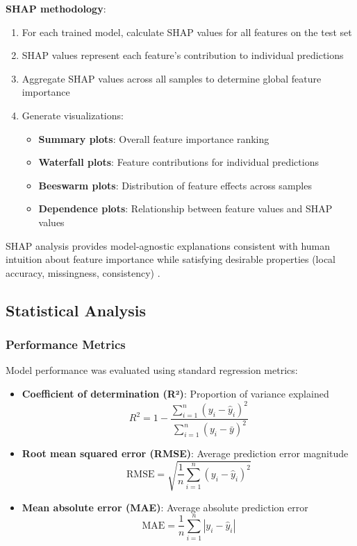 \textbf{SHAP methodology}:
\begin{enumerate}
    \item For each trained model, calculate SHAP values for all features on the test set
    \item SHAP values represent each feature's contribution to individual predictions
    \item Aggregate SHAP values across all samples to determine global feature importance
    \item Generate visualizations:
    \begin{itemize}
        \item \textbf{Summary plots}: Overall feature importance ranking
        \item \textbf{Waterfall plots}: Feature contributions for individual predictions
        \item \textbf{Beeswarm plots}: Distribution of feature effects across samples
        \item \textbf{Dependence plots}: Relationship between feature values and SHAP values
    \end{itemize}
\end{enumerate}

SHAP analysis provides model-agnostic explanations consistent with human intuition about feature importance while satisfying desirable properties (local accuracy, missingness, consistency) \citep{lundberg2017unified}.

\subsection{Statistical Analysis}

\subsubsection{Performance Metrics}

Model performance was evaluated using standard regression metrics:

\begin{itemize}
    \item \textbf{Coefficient of determination (R²)}: Proportion of variance explained
    \begin{equation}
        R^2 = 1 - \frac{\sum_{i=1}^{n}(y_i - \hat{y}_i)^2}{\sum_{i=1}^{n}(y_i - \bar{y})^2}
    \end{equation}

    \item \textbf{Root mean squared error (RMSE)}: Average prediction error magnitude
    \begin{equation}
        \text{RMSE} = \sqrt{\frac{1}{n}\sum_{i=1}^{n}(y_i - \hat{y}_i)^2}
    \end{equation}

    \item \textbf{Mean absolute error (MAE)}: Average absolute prediction error
    \begin{equation}
        \text{MAE} = \frac{1}{n}\sum_{i=1}^{n}|y_i - \hat{y}_i|
    \end{equation}
\end{itemize}


